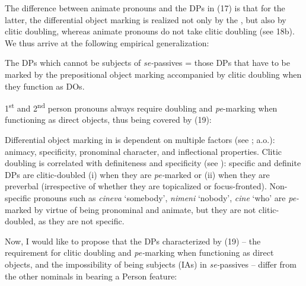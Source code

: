 \documentclass[output=paper]{langsci/langscibook}
\begin{document}
The difference between animate  pronouns and the DPs in (17) is that for the latter, the differential object marking is realized not only by the , but also by clitic doubling, whereas animate  pronouns do not take clitic doubling (see 18b). We thus arrive at the following empirical generalization:

\ea%
    \label{ex:giurgea:19}
    The DPs which cannot be subjects of \textit{se-}passives = those DPs that have to be marked by the prepositional object marking accompanied by clitic doubling when they function as DOs.
\z

1\textsuperscript{st} and 2\textsuperscript{nd} person pronouns always require doubling and \textit{pe}{}-marking when functioning as direct objects, thus being covered by (19):

\ea%
    \label{ex:giurgea:20}
    \z
\z

Differential object marking in  is dependent on multiple factors (see \citealt{Dobrovie-Sorin1994,Cornilescu2000,Mardale2008,Tigău2010,Tigău2014}; a.o.): animacy, specificity, pronominal character, and inflectional properties. Clitic doubling is correlated with definiteness and specificity (see \citealt{Marchis2013}): specific and definite DPs are clitic-doubled (i) when they are \textit{pe-}marked or (ii) when they are preverbal (irrespective of whether they are topicalized or focus-fronted). Non-specific pronouns such as \textit{cineva} ‘somebody’, \textit{nimeni} ‘nobody’, \textit{cine} ‘who’ are \textit{pe-}marked by virtue of being pronominal and animate, but they are not clitic-doubled, as they are not specific.

Now, I would like to propose that the DPs characterized by (19) – the requirement for clitic doubling and \textit{pe-}marking when functioning as direct objects, and the impossibility of being subjects (IAs) in \textit{se-}passives – differ from the other nominals in bearing a Person feature:
\end{document}
